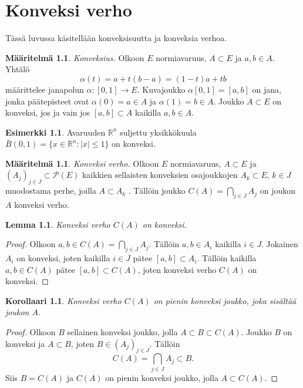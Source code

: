 \documentclass[12pt,a4paper,leqno]{report}
\newcommand{\R}{\mathbb{R}}
\theoremstyle{plain}
\newtheorem{lem}[equation]{Lemma}
\newtheorem{kor}[equation]{Korollaari}
\theoremstyle{definition}
\newtheorem{maar}[equation]{Määritelmä}
\newtheorem{esim}[equation]{Esimerkki}
\theoremstyle{remark}
\begin{document}
\chapter{Konveksi verho}\label{konverho}
Tässä luvussa käsitellään konveksisuutta ja konveksia verhoa.
\begin{maar}%
\emph{Konveksius.}
 Olkoon $E$ normiavaruus, $A\subset E$ ja $a,b\in A$. Yhtälö 
$$\alpha (t)=a+t(b-a)=(1-t)a+tb$$ 
määrittelee janapolun $\alpha \colon [0,1]\rightarrow E$. Kuvajoukko $\alpha [0,1] = [a,b]$ on jana, jonka päätepisteet ovat $\alpha (0)=a\in A$ ja $\alpha (1)=b\in A$. 
Joukko $A\subset E$ on konveksi, jos ja vain jos $[a,b]\subset A$ kaikilla $a,b\in A$.
\end{maar}
\begin{esim}
Avaruuden $\R ^n$ suljettu yksikkökuula $ \bar B(0,1)= \{x\in \R ^n \colon |x|\leq 1\}$ on konveksi.
\end{esim}
\begin{maar}\emph{Konveksi verho.} Olkoon $E$ normiavaruus, $A\subset E$ ja $(A_j)_{j\in J}\subset \mathcal{P}(E)$ 
kaikkien sellaisten konveksien osajoukkojen $A_k\subset E$, $k\in J$ muodostama perhe, joilla %
$A\subset A_k$%
. Tällöin joukko $C(A)=\bigcap_{j\in J} A_j$ on joukon $A$ konveksi verho. 
\end{maar}
\begin{lem} Konveksi verho $C(A)$ on konveksi.\end{lem} 
\begin{proof} Olkoon $a,b\in C(A)=\bigcap_{j\in J} A_j$. 
Tällöin $a,b\in A_i$ kaikilla $i\in J$. %
Jokainen $A_i$ on konveksi, joten kaikilla $i\in J$ pätee $[a,b]\subset A_i$.
Tällöin kaikilla $a,b\in C(A)$ pätee $[a,b] \subset C(A)$, joten konveksi verho $C(A)$ on konveksi.
\end{proof}
\begin{kor}Konveksi verho $C(A)$ on pienin konveksi joukko, joka sisältää joukon $A$.
\end{kor}
\begin{proof} Olkoon $B$ sellainen konveksi joukko, jolla $A\subset B\subset C(A)$. 
Joukko $B$ on konveksi ja $A\subset B$, joten $B\in (A_j)_{j\in J}$. 
Tällöin $$C(A)=\bigcap_{j\in J} A_j\subset B.$$
Siis $B= C(A)$ ja $C(A)$ on pienin konveksi joukko, jolla $A\subset C(A)$.
\end{proof}
\end{document}
